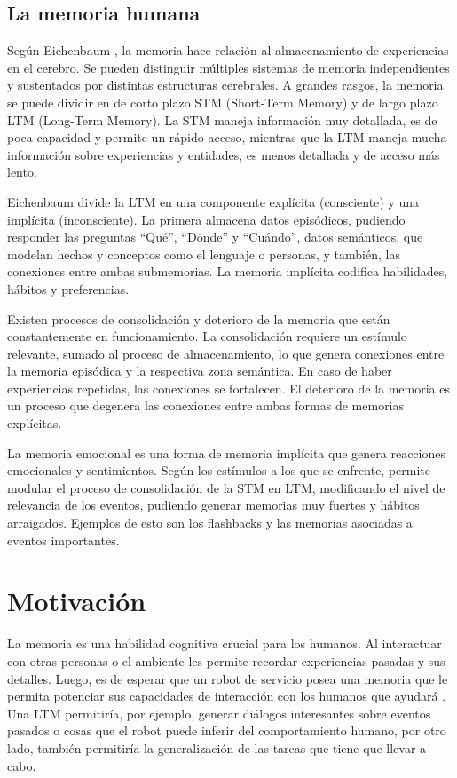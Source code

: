 \subsection{La memoria humana}
Según Eichenbaum \cite{Eichenbaum:2008}, la memoria hace relación al almacenamiento de experiencias en el cerebro. Se pueden distinguir múltiples sistemas de memoria independientes y sustentados por distintas estructuras cerebrales. A grandes rasgos, la memoria se puede dividir en de corto plazo STM (Short-Term Memory) y de largo plazo LTM (Long-Term Memory). La STM maneja información muy detallada, es de poca capacidad y permite un rápido acceso, mientras que la LTM maneja mucha información sobre experiencias y entidades, es menos detallada y de acceso más lento.

Eichenbaum divide la LTM en una componente explícita (consciente) y una implícita (inconsciente). La primera almacena datos episódicos, pudiendo responder las preguntas ``Qué'', ``Dónde'' y ``Cuándo'', datos semánticos, que modelan hechos y conceptos como el lenguaje o personas, y también, las conexiones entre ambas submemorias. La memoria implícita codifica habilidades, hábitos y preferencias.

Existen procesos de consolidación y deterioro de la memoria que están constantemente en funcionamiento. La consolidación requiere un estímulo relevante, sumado al proceso de almacenamiento, lo que genera conexiones entre la memoria episódica y la respectiva zona semántica. En caso de haber experiencias repetidas, las conexiones se fortalecen. El deterioro de la memoria es un proceso que degenera las conexiones entre ambas formas de memorias explícitas.

La memoria emocional es una forma de memoria implícita que genera reacciones emocionales y sentimientos. Según los estímulos a los que se enfrente, permite modular el proceso de consolidación de la STM en LTM, modificando el nivel de relevancia de los eventos, pudiendo generar memorias muy fuertes y hábitos arraigados. Ejemplos de esto son los flashbacks y las memorias asociadas a eventos importantes.




\section{Motivación}


La memoria es una habilidad cognitiva crucial para los humanos. Al interactuar con otras personas o el ambiente les permite recordar experiencias pasadas y sus detalles. Luego, es de esperar que un robot de servicio posea una memoria que le permita potenciar sus capacidades de interacción con los humanos que ayudará \cite{Vijayakumar2014}. Una LTM permitiría, por ejemplo, generar diálogos interesantes sobre eventos pasados o cosas que el robot puede inferir del comportamiento humano, por otro lado, también permitiría la generalización de las tareas que tiene que llevar a cabo.

